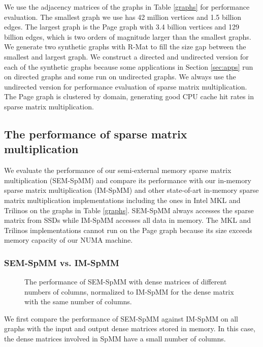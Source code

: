 We use the adjacency matrices of the graphs in Table \ref{graphs} for performance
evaluation. The smallest graph we use has 42 million vertices and 1.5 billion
edges. The largest graph is the Page graph with 3.4 billion vertices
and 129 billion edges, which is two orders of magnitude larger than the smallest
graphs. We generate two synthetic graphs with R-Mat \cite{rmat} to fill the size
gap between the smallest and largest graph. We construct a directed and
undirected version for each of the synthetic graphs
because some applications in Section \ref{sec:apps} run on directed graphs
and some run on undirected graphs. We always use the undirected version for
performance evaluation of sparse matrix multiplication. The Page graph is clustered
by domain, generating good CPU cache hit rates in sparse matrix multiplication.

\subsection{The performance of sparse matrix multiplication}

We evaluate the performance of our semi-external memory sparse matrix
multiplication (SEM-SpMM) and compare its performance with our in-memory
sparse matrix multiplication (IM-SpMM) and other state-of-art in-memory sparse
matrix multiplication implementations including the ones in Intel MKL and
Trilinos on the graphs in Table \ref{graphs}.
SEM-SpMM always accesses the sparse matrix from SSDs while IM-SpMM accesses all
data in memory. The MKL and Trilinos implementations cannot run on the Page graph
because its size exceeds memory capacity of our NUMA machine.

\subsubsection{SEM-SpMM vs. IM-SpMM}

\begin{figure}
	\begin{center}
		\footnotesize
		
		\caption{The performance of SEM-SpMM with dense matrices of different
			numbers of columns, normalized to IM-SpMM for the dense matrix with
			the same number of columns.}
		\label{perf:spmm_comp}
	\end{center}
\end{figure}

We first compare the performance of SEM-SpMM against IM-SpMM on all graphs with
the input and output dense matrices stored in memory. In this case, the dense
matrices involved in SpMM have a small number of columns.

